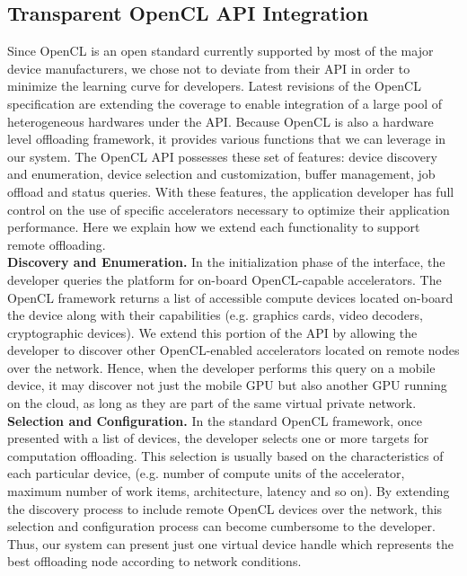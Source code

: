 \documentclass[10pt, conference, compsocconf]{IEEEtran}
\begin{document}
\subsection{Transparent OpenCL API Integration}
%
Since OpenCL is an open standard currently supported by most of the major 
device manufacturers, we chose not to deviate from their API in order to 
minimize the learning curve for developers. 
%
Latest revisions of the OpenCL specification are extending the coverage to 
enable integration of a large pool of heterogeneous hardwares under the API.
%
Because OpenCL is also a hardware level offloading framework, it provides 
various functions that we can leverage in our system.
%
The OpenCL API possesses these set of features: device discovery and 
enumeration, device selection and customization, buffer management, job 
offload and status queries.
%
With these features, the application developer has full control on the 
use of specific accelerators necessary to optimize their application 
performance.
%
Here we explain how we extend each functionality to support remote
offloading.\\
%
\indent\textbf{Discovery and Enumeration.}
In the initialization phase of the interface, the developer queries the 
platform for on-board OpenCL-capable accelerators.
%
The OpenCL framework returns a list of accessible compute devices located 
on-board the device along with their capabilities (e.g. graphics cards, video 
decoders, cryptographic devices).
%
We extend this portion of the API by allowing the developer to discover other 
OpenCL-enabled accelerators located on remote nodes over the network. 
%
Hence, when the developer performs this query on a mobile device, it may 
discover not just the mobile GPU but also another GPU running on the cloud,
as long as they are part of the same virtual private network.\\
%
\indent\textbf{Selection and Configuration.}
In the standard OpenCL framework, once presented with a list of devices, the 
developer selects one or more targets for computation offloading.
%
This selection is usually based on the characteristics of each particular 
device, (e.g. number of compute units of the accelerator, maximum number of 
work items, architecture, latency and so on).
%
By extending the discovery process to include remote OpenCL devices over 
the network, this selection and configuration process can become cumbersome 
to the developer.
%
Thus, our system can present just one virtual device handle which represents
the best offloading node according to network conditions.
\end{document}
